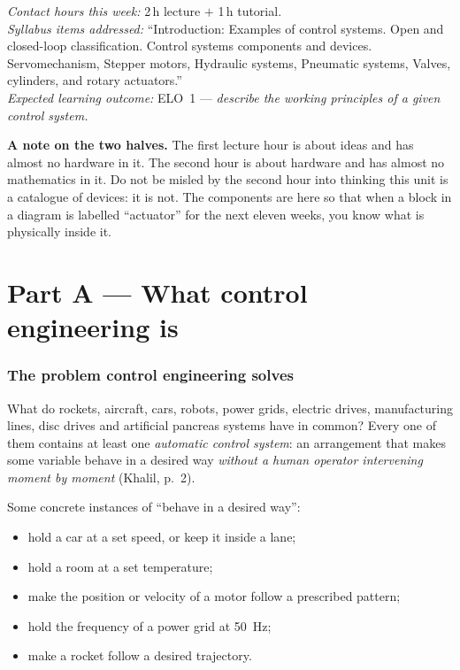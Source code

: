 \documentclass[11pt,a4paper]{article}
\begin{document}
\noindent
\emph{Contact hours this week:} 2\,h lecture $+$ 1\,h tutorial.\\
\emph{Syllabus items addressed:} ``Introduction: Examples of control systems.
Open and closed-loop classification. Control systems components and devices.
Servomechanism, Stepper motors, Hydraulic systems, Pneumatic systems, Valves,
cylinders, and rotary actuators.''\\
\emph{Expected learning outcome:} ELO~1 --- \emph{describe the working
principles of a given control system.}

\bigskip
\noindent
\textbf{A note on the two halves.} The first lecture hour is about ideas and
has almost no hardware in it. The second hour is about hardware and has almost
no mathematics in it. Do not be misled by the second hour into thinking this
unit is a catalogue of devices: it is not. The components are here so that when
a block in a diagram is labelled ``actuator'' for the next eleven weeks, you
know what is physically inside it.

\part*{Part A --- What control engineering is}

\section{The problem control engineering solves}

What do rockets, aircraft, cars, robots, power grids, electric drives,
manufacturing lines, disc drives and artificial pancreas systems have in
common? Every one of them contains at least one \emph{automatic control
system}: an arrangement that makes some variable behave in a desired way
\emph{without a human operator intervening moment by moment}
(Khalil, p.~2).

Some concrete instances of ``behave in a desired way'':

\begin{itemize}[leftmargin=*]
\item hold a car at a set speed, or keep it inside a lane;
\item hold a room at a set temperature;
\item make the position or velocity of a motor follow a prescribed pattern;
\item hold the frequency of a power grid at \SI{50}{\hertz};
\item make a rocket follow a desired trajectory.
\end{itemize}
\end{document}
